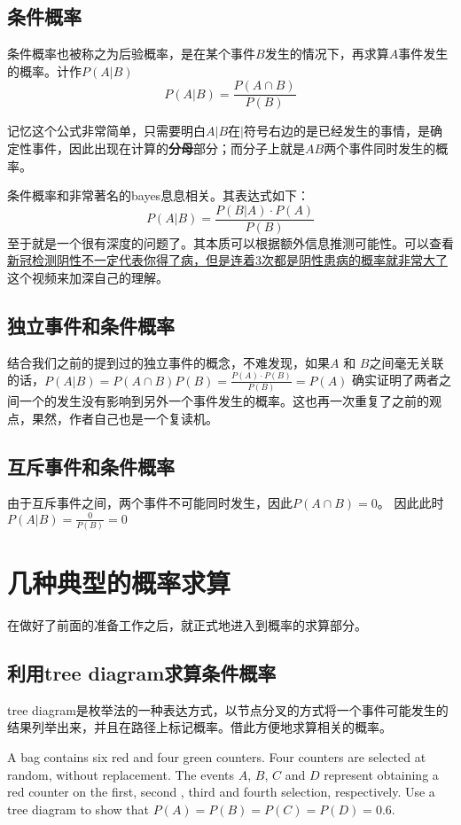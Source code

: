 \subsection*{条件概率}
条件概率也被称之为后验概率，是在某个事件$B$发生的情况下，再求算$A$事件发生的概率。计作$P(A|B)$
\[
	P(A|B) = \frac{P(A\cap B)}{P(B)}
\]
\begin{SummBox}
记忆这个公式非常简单，只需要明白${A|B}$在$|$符号右边的是已经发生的事情，是确定性事件，因此出现在计算的\textbf{分母}部分；而分子上就是$AB$两个事件同时发生的概率。
\end{SummBox}

条件概率和非常著名的\gls{bayes}息息相关。其表达式如下：
\[
	P(A|B) = \frac{P(B|A)\cdot P(A)}{P(B)}
\]
至于就是一个很有深度的问题了。其本质可以根据额外信息推测可能性。可以查看\href{https://www.bilibili.com/video/BV1Ei4y1F72M}{新冠检测阴性不一定代表你得了病，但是连着3次都是阴性患病的概率就非常大了} 这个视频来加深自己的理解。

\subsection*{独立事件和条件概率}
结合我们之前的提到过的独立事件的概念，不难发现，如果$A$ 和 $B$之间毫无关联的话，$P(A|B)={P(A\cap B)}{P(B)}=\frac{P(A)\cdot P(B)}{P(B)}=P(A)$ 确实证明了两者之间一个的发生没有影响到另外一个事件发生的概率。这也再一次重复了之前的观点，果然，作者自己也是一个复读机。

\subsection*{互斥事件和条件概率}
由于互斥事件之间，两个事件不可能同时发生，因此$P(A\cap B) = 0$。 因此此时$P(A|B)=\frac{0}{P(B)}=0$
\clearpage

\section{几种典型的概率求算}
在做好了前面的准备工作之后，就正式地进入到概率的求算部分。

\subsection*{利用tree diagram求算条件概率}
tree diagram是枚举法的一种表达方式，以节点分叉的方式将一个事件可能发生的结果列举出来，并且在路径上标记概率。借此方便地求算相关的概率。
\begin{TaskBox}
A bag contains six red and four green counters. Four counters are selected at random, without replacement. The events $A$, $B$, $C$ and $D$ represent obtaining a red counter on the first, second , third and fourth selection, respectively. Use a tree diagram to show that $P(A) = P(B) = P(C) = P(D) = 0.6$.
\end{TaskBox}

